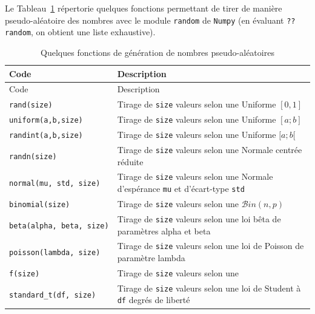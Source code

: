 \documentclass[
  12pt,
]{book}
\numberwithin{equation}{section}
\numberwithin{countremarque}{section}
\begin{document}
Le Tableau~\ref{tab:numpy-pseudo-aleatoires} répertorie quelques fonctions permettant de tirer de manière pseudo-aléatoire des nombres avec le module \texttt{random} de \texttt{Numpy} (en évaluant \texttt{??random}, on obtient une liste exhaustive).

\begin{longtable}[]{@{}
  >{\raggedleft\arraybackslash}p{}
  >{\raggedleft\arraybackslash}p{}@{}}
\caption{\label{tab:numpy-pseudo-aleatoires} Quelques fonctions de génération de nombres pseudo-aléatoires}\tabularnewline
\toprule\noalign{}
\begin{minipage}[b]{\linewidth}\raggedleft
Code
\end{minipage} & \begin{minipage}[b]{\linewidth}\raggedleft
Description
\end{minipage} \\
\midrule\noalign{}
\endfirsthead
\toprule\noalign{}
\begin{minipage}[b]{\linewidth}\raggedleft
Code
\end{minipage} & \begin{minipage}[b]{\linewidth}\raggedleft
Description
\end{minipage} \\
\midrule\noalign{}
\endhead
\bottomrule\noalign{}
\endlastfoot
\texttt{rand(size)} & Tirage de \texttt{size} valeurs selon une Uniforme \([0,1]\) \\
\texttt{uniform(a,b,size)} & Tirage de \texttt{size} valeurs selon une Uniforme \([a ; b]\) \\
\texttt{randint(a,b,size)} & Tirage de \texttt{size} valeurs selon une Uniforme \([a ; b[\) \\
\texttt{randn(size)} & Tirage de \texttt{size} valeurs selon une Normale centrée réduite \\
\texttt{normal(mu,\ std,\ size)} & Tirage de \texttt{size} valeurs selon une Normale d'espérance \texttt{mu} et d'écart-type \texttt{std} \\
\texttt{binomial(size)} & Tirage de \texttt{size} valeurs selon une \(\mathcal{B}in(n,p)\) \\
\texttt{beta(alpha,\ beta,\ size)} & Tirage de \texttt{size} valeurs selon une loi bêta de paramètres alpha et beta \\
\texttt{poisson(lambda,\ size)} & Tirage de \texttt{size} valeurs selon une loi de Poisson de paramètre lambda \\
\texttt{f(size)} & Tirage de \texttt{size} valeurs selon une \\
\texttt{standard\_t(df,\ size)} & Tirage de \texttt{size} valeurs selon une loi de Student à \texttt{df} degrés de liberté \\
\end{longtable}
\end{document}
